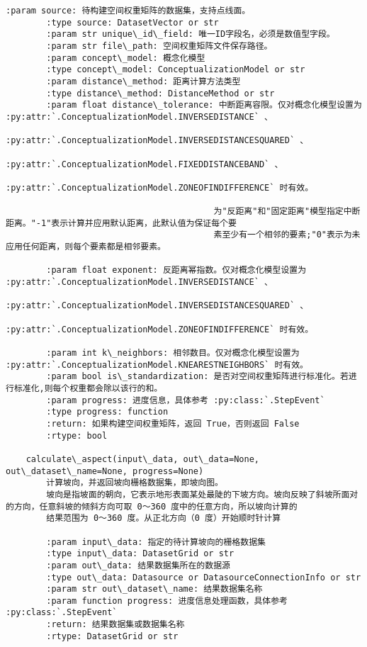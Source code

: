 \documentclass[11pt]{article}
\begin{document}
\begin{Verbatim}[commandchars=\\\{\}]
        :param source: 待构建空间权重矩阵的数据集，支持点线面。
        :type source: DatasetVector or str
        :param str unique\_id\_field: 唯一ID字段名，必须是数值型字段。
        :param str file\_path: 空间权重矩阵文件保存路径。
        :param concept\_model: 概念化模型
        :type concept\_model: ConceptualizationModel or str
        :param distance\_method: 距离计算方法类型
        :type distance\_method: DistanceMethod or str
        :param float distance\_tolerance: 中断距离容限。仅对概念化模型设置为 :py:attr:`.ConceptualizationModel.INVERSEDISTANCE` 、
                                         :py:attr:`.ConceptualizationModel.INVERSEDISTANCESQUARED` 、
                                         :py:attr:`.ConceptualizationModel.FIXEDDISTANCEBAND` 、
                                         :py:attr:`.ConceptualizationModel.ZONEOFINDIFFERENCE` 时有效。
        
                                         为"反距离"和"固定距离"模型指定中断距离。"-1"表示计算并应用默认距离，此默认值为保证每个要
                                         素至少有一个相邻的要素;"0"表示为未应用任何距离，则每个要素都是相邻要素。
        
        :param float exponent: 反距离幂指数。仅对概念化模型设置为 :py:attr:`.ConceptualizationModel.INVERSEDISTANCE` 、
                               :py:attr:`.ConceptualizationModel.INVERSEDISTANCESQUARED` 、
                               :py:attr:`.ConceptualizationModel.ZONEOFINDIFFERENCE` 时有效。
        
        :param int k\_neighbors: 相邻数目。仅对概念化模型设置为 :py:attr:`.ConceptualizationModel.KNEARESTNEIGHBORS` 时有效。
        :param bool is\_standardization: 是否对空间权重矩阵进行标准化。若进行标准化,则每个权重都会除以该行的和。
        :param progress: 进度信息，具体参考 :py:class:`.StepEvent`
        :type progress: function
        :return: 如果构建空间权重矩阵，返回 True，否则返回 False
        :rtype: bool
    
    calculate\_aspect(input\_data, out\_data=None, out\_dataset\_name=None, progress=None)
        计算坡向，并返回坡向栅格数据集，即坡向图。
        坡向是指坡面的朝向，它表示地形表面某处最陡的下坡方向。坡向反映了斜坡所面对的方向，任意斜坡的倾斜方向可取 0～360 度中的任意方向，所以坡向计算的
        结果范围为 0～360 度。从正北方向（0 度）开始顺时针计算
        
        :param input\_data: 指定的待计算坡向的栅格数据集
        :type input\_data: DatasetGrid or str
        :param out\_data: 结果数据集所在的数据源
        :type out\_data: Datasource or DatasourceConnectionInfo or str
        :param str out\_dataset\_name: 结果数据集名称
        :param function progress: 进度信息处理函数，具体参考 :py:class:`.StepEvent`
        :return: 结果数据集或数据集名称
        :rtype: DatasetGrid or str
    

\end{Verbatim}
\end{document}
